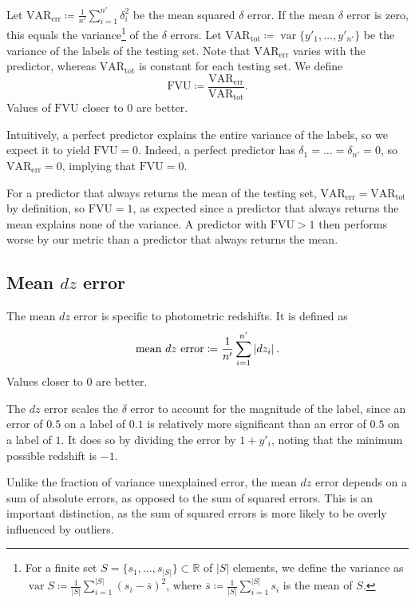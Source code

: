 \documentclass[11pt,twoside]{report}
\newcommand\bbR{\mathbb{R}}
\newcommand\abs[1]{\left|#1\right|}
\DeclareMathOperator{\var}{var}
\begin{document}
Let $\mathrm{VAR_{err}} \coloneqq \frac{1}{n'}\sum_{i=1}^{n'}\delta_i^2$ be the mean squared $\delta$ error. If the mean $\delta$ error is zero, this equals the variance\footnote{For a finite set $S = \{s_1, \dots, s_{\abs{S}}\} \subset \bbR$ of $\abs{S}$ elements, we define the variance as $\var S \coloneqq \frac1{\abs{S}}\sum_{i=1}^{\abs{S}}(s_i - \overline{s})^2$, where $\overline{s} \coloneqq \frac1{\abs{S}}\sum_{i=1}^{\abs{S}}s_i$ is the mean of $S$.} of the $\delta$ errors. Let $\mathrm{VAR_{tot}} \coloneqq \var\{y'_1, \dots, y'_{n'}\}$ be the variance of the labels of the testing set. Note that $\mathrm{VAR_{err}}$ varies with the predictor, whereas $\mathrm{VAR_{tot}}$ is constant for each testing set. We define \[
  \mathrm{FVU} \coloneqq \frac{\mathrm{VAR_{err}}}{\mathrm{VAR_{tot}}} \text{.}
\]  Values of $\mathrm{FVU}$ closer to $0$ are better.

Intuitively, a perfect predictor explains the entire variance of the labels, so we expect it to yield $\mathrm{FVU} = 0$. Indeed, a perfect predictor has $\delta_1 = \dots = \delta_{n'} = 0$, so $\mathrm{VAR_{err}} = 0$, implying that $\mathrm{FVU} = 0$.

For a predictor that always returns the mean of the testing set, $\mathrm{VAR_{err}} = \mathrm{VAR_{tot}}$ by definition, so $\mathrm{FVU} = 1$, as expected since a predictor that always returns the mean explains none of the variance. A predictor with $\mathrm{FVU} > 1$ then performs worse by our metric than a predictor that always returns the mean.

\subsection{Mean $dz$ error}

The mean $dz$ error is specific to photometric redshifts. It is defined as \[
  \textrm{mean $dz$ error} \coloneqq \frac{1}{n'}\sum_{i=1}^{n'} \abs{dz_i} \text.
\] Values closer to $0$ are better.

The $dz$ error scales the $\delta$ error to account for the magnitude of the label, since an error of $0.5$ on a label of $0.1$ is relatively more significant than an error of $0.5$ on a label of $1$. It does so by dividing the error by $1 + y'_i$, noting that the minimum possible redshift is $-1$.

Unlike the fraction of variance unexplained error, the mean $dz$ error depends on a sum of absolute errors, as opposed to the sum of squared errors. This is an important distinction, as the sum of squared errors is more likely to be overly influenced by outliers.
\end{document}
